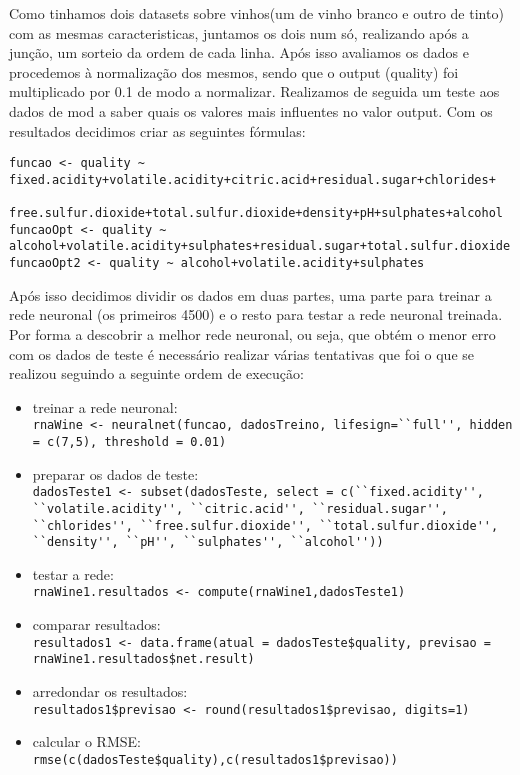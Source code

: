 \documentclass{article}
\begin{document}
Como tinhamos dois datasets sobre vinhos(um de vinho branco e outro de tinto) com as mesmas caracteristicas, juntamos os dois num só, realizando após a junção, um sorteio da ordem de cada linha.
Após isso avaliamos os dados e procedemos à normalização dos mesmos, sendo que o output (quality) foi multiplicado por 0.1 de modo a normalizar.
Realizamos de seguida um teste aos dados de mod a saber quais os valores mais influentes no valor output. Com os resultados decidimos criar as seguintes fórmulas:
\begin{verbatim}
funcao <- quality ~ fixed.acidity+volatile.acidity+citric.acid+residual.sugar+chlorides+
                    free.sulfur.dioxide+total.sulfur.dioxide+density+pH+sulphates+alcohol
funcaoOpt <- quality ~ alcohol+volatile.acidity+sulphates+residual.sugar+total.sulfur.dioxide
funcaoOpt2 <- quality ~ alcohol+volatile.acidity+sulphates
\end{verbatim}
Após isso decidimos dividir os dados em duas partes, uma parte para treinar a rede neuronal (os primeiros 4500) e o resto para testar a rede neuronal treinada.
Por forma a descobrir a melhor rede neuronal, ou seja, que obtém o menor erro com os dados de teste é necessário realizar várias tentativas que foi o que se realizou seguindo a seguinte ordem de execução:
\begin{itemize}
    \item treinar a rede neuronal: \\
        \verb|rnaWine <- neuralnet(funcao, dadosTreino, lifesign=``full'', hidden = c(7,5), threshold = 0.01)|
    \item preparar os dados de teste: \\ 
        \verb|dadosTeste1 <- subset(dadosTeste, select = c(``fixed.acidity'', ``volatile.acidity'', ``citric.acid'', ``residual.sugar'', ``chlorides'', ``free.sulfur.dioxide'', ``total.sulfur.dioxide'', ``density'', ``pH'', ``sulphates'', ``alcohol''))|
    \item testar a rede: \\
        \verb|rnaWine1.resultados <- compute(rnaWine1,dadosTeste1)|
    \item comparar resultados: \\
        \verb|resultados1 <- data.frame(atual = dadosTeste$quality, previsao = rnaWine1.resultados$net.result)|
    \item arredondar os resultados: \\
        \verb|resultados1$previsao <- round(resultados1$previsao, digits=1)|
    \item calcular o RMSE: \\
        \verb|rmse(c(dadosTeste$quality),c(resultados1$previsao))|
\end{itemize}
\end{document}
